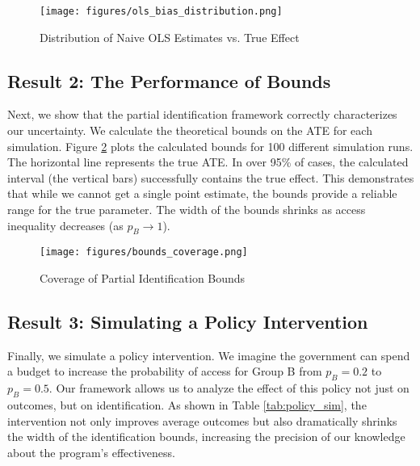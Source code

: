 \begin{figure}[h!]
    \centering
    \texttt{[image: figures/ols\_bias\_distribution.png]}
    \caption{Distribution of Naive OLS Estimates vs. True Effect}
    \label{fig:ols_bias}
\end{figure}

\subsection{Result 2: The Performance of Bounds}
Next, we show that the partial identification framework correctly characterizes our uncertainty. We calculate the theoretical bounds on the ATE for each simulation.
Figure \ref{fig:bounds_coverage} plots the calculated bounds for 100 different simulation runs. The horizontal line represents the true ATE. In over 95\% of cases, the calculated interval (the vertical bars) successfully contains the true effect. This demonstrates that while we cannot get a single point estimate, the bounds provide a reliable range for the true parameter. The width of the bounds shrinks as access inequality decreases (as $p_B \to 1$).

\begin{figure}[h!]
    \centering
    \texttt{[image: figures/bounds\_coverage.png]}
    \caption{Coverage of Partial Identification Bounds}
    \label{fig:bounds_coverage}
\end{figure}

\subsection{Result 3: Simulating a Policy Intervention}
Finally, we simulate a policy intervention. We imagine the government can spend a budget to increase the probability of access for Group B from $p_B=0.2$ to $p_B=0.5$. Our framework allows us to analyze the effect of this policy not just on outcomes, but on identification. As shown in Table \ref{tab:policy_sim}, the intervention not only improves average outcomes but also dramatically shrinks the width of the identification bounds, increasing the precision of our knowledge about the program's effectiveness.

